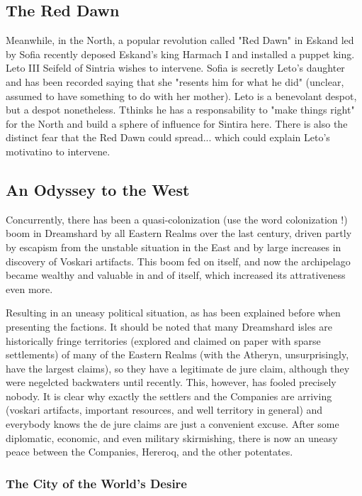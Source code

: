 \subsection{The Red Dawn}

Meanwhile, in the North, a popular revolution called "Red Dawn" in Eskand led by Sofia recently deposed Eskand's king Harmach I and installed a puppet king. Leto III Seifeld of Sintria wishes to intervene. Sofia is secretly Leto's daughter and has been recorded saying that she "resents him for what he did" (unclear, assumed to have something to do with her mother). Leto is a benevolant despot, but a despot nonetheless. Tthinks he has a responsability to "make things right" for the North and build a sphere of influence for Sintira here. There is also the distinct fear that the Red Dawn could spread... which could explain Leto's motivatino to intervene.

\subsection{An Odyssey to the West}
 
Concurrently, there has been a quasi-colonization (use the word colonization !) boom in Dreamshard by all Eastern Realms over the last century, driven partly by escapism from the unstable situation in the East and by large increases in discovery of Voskari artifacts. This boom fed on itself, and now the archipelago became wealthy and valuable in and of itself, which increased its attrativeness even more.

Resulting in an uneasy political situation, as has been explained before when presenting the factions. It should be noted that many Dreamshard isles are historically fringe territories (explored and claimed on paper with sparse settlements) of many of the Eastern Realms (with the Atheryn, unsurprisingly, have the largest claims), so they have a legitimate de jure claim, although they were negelcted backwaters until recently. This, however, has fooled precisely nobody. It is clear why exactly the settlers and the Companies are arriving (voskari artifacts, important resources, and well territory in general) and everybody knows the de jure claims are just a convenient excuse. After some diplomatic, economic, and even military skirmishing, there is now an uneasy peace between the Companies, Hereroq, and the other potentates.

\subsubsection{The City of the World's Desire}

